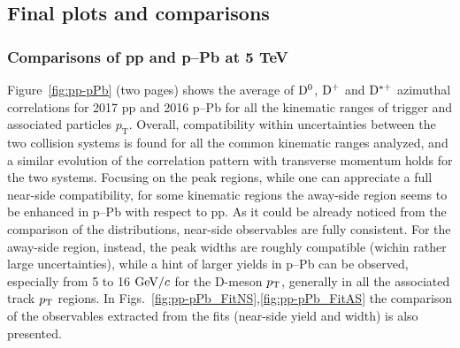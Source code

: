 \subsection{Final plots and comparisons}

\subsubsection{Comparisons of pp and p--Pb at 5 TeV}
Figure~\ref{fig:pp-pPb} (two pages) shows the average of ${\rm D^0}$, ${\rm D^+}$ and ${\rm D^{*+}}$ azimuthal correlations for 2017 pp and 2016 p--Pb for all the kinematic ranges of trigger and associated particles $p_\mathrm{T}$. Overall, compatibility within uncertainties between the two collision systems is found for all the common kinematic ranges analyzed, and a similar evolution of the correlation pattern with transverse momentum holds for the two systems. Focusing on the peak regions, while one can appreciate a full near-side compatibility, for some kinematic regions the away-side region seems to be enhanced in p--Pb with respect to pp. As it could be already noticed from the comparison of the distributions, near-side observables are fully consistent. For the away-side region, instead, the peak widths are roughly compatible (wichin rather large uncertainties), while a hint of larger yields in p--Pb can be observed, especially from 5 to 16 $\mathrm{GeV}/c$ for the D-meson $p_{\rm T}$, generally in all the associated track $p_{\rm T}$ regions. In Figs.~\ref{fig:pp-pPb_FitNS},\ref{fig:pp-pPb_FitAS} the comparison of the observables extracted from the fits (near-side yield and width) is also presented.

